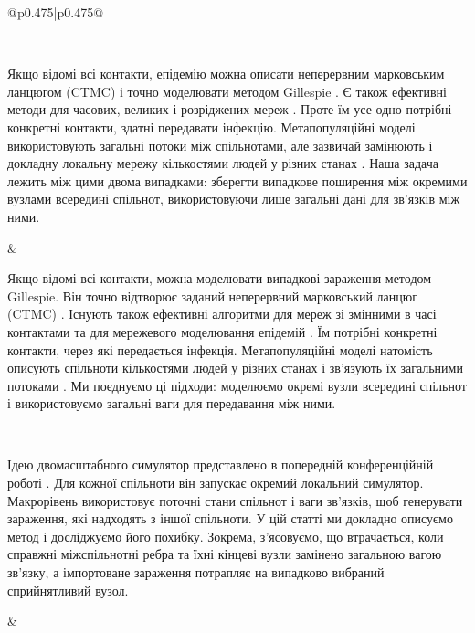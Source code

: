 \documentclass[11pt]{article}
\begin{document}
\begin{longtable}{@{}p{0.475\textwidth}|p{0.475\textwidth}@{}}
\begin{minipage}[t]{\linewidth}
\end{minipage} \\[5mm]
\begin{minipage}[t]{\linewidth}
Якщо відомі всі контакти, епідемію можна описати неперервним марковським ланцюгом (CTMC) і точно моделювати методом Gillespie \citep{gillespie1977exact,gibson2000}. Є також ефективні методи для часових, великих і розріджених мереж \citep{vestergaard2015,kuryliak2025simulating}. Проте їм усе одно потрібні конкретні контакти, здатні передавати інфекцію. Метапопуляційні моделі використовують загальні потоки між спільнотами, але зазвичай замінюють і докладну локальну мережу кількостями людей у різних станах \citep{colizza2007reaction,colizza2008,balcan2010modeling,ajelli2010}. Наша задача лежить між цими двома випадками: зберегти випадкове поширення між окремими вузлами всередині спільнот, використовуючи лише загальні дані для зв'язків між ними.
\end{minipage} &
\begin{minipage}[t]{\linewidth}
Якщо відомі всі контакти, можна моделювати випадкові зараження методом Gillespie. Він точно відтворює заданий неперервний марковський ланцюг (CTMC) \citep{gillespie1977exact,gibson2000}. Існують також ефективні алгоритми для мереж зі змінними в часі контактами та для мережевого моделювання епідемій \citep{vestergaard2015,kuryliak2025simulating}. Їм потрібні конкретні контакти, через які передається інфекція. Метапопуляційні моделі натомість описують спільноти кількостями людей у різних станах і зв'язують їх загальними потоками \citep{colizza2007reaction,colizza2008,balcan2010modeling,ajelli2010}. Ми поєднуємо ці підходи: моделюємо окремі вузли всередині спільнот і використовуємо загальні ваги для передавання між ними.
\end{minipage} \\[5mm]
\begin{minipage}[t]{\linewidth}
Ідею двомасштабного симулятор представлено в попередній конференційній роботі \citep{kuryliak2025towards}. Для кожної спільноти він запускає окремий локальний симулятор. Макрорівень використовує поточні стани спільнот і ваги зв'язків, щоб генерувати зараження, які надходять з іншої спільноти. У цій статті ми докладно описуємо метод і досліджуємо його похибку. Зокрема, з'ясовуємо, що втрачається, коли справжні міжспільнотні ребра та їхні кінцеві вузли замінено загальною вагою зв'язку, а імпортоване зараження потрапляє на випадково вибраний сприйнятливий вузол.
\end{minipage} &
\begin{minipage}[t]{\linewidth}

\end{minipage}
\end{longtable}
\end{document}
